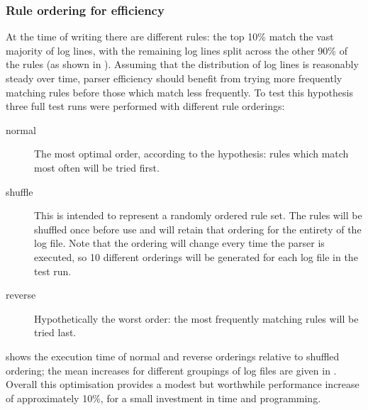 \subsubsection{Rule ordering for efficiency}

\label{rule ordering for efficiency}

At the time of writing there are \numberOFrules{} different rules: the top
10\% match the vast majority of log lines, with the remaining log lines
split across the other 90\% of the rules (as shown in ).  Assuming that the distribution of log lines is reasonably steady
over time, parser efficiency should benefit from trying more frequently
matching rules before those which match less frequently.  To test this
hypothesis three full test runs were performed with different rule
orderings:

\begin{description}

    \item [normal]  The most optimal order, according to the hypothesis:
        rules which match most often will be tried first.

    \item [shuffle] This is intended to represent a randomly ordered rule
        set.  The rules will be shuffled once before use and will retain
        that ordering for the entirety of the log file.  Note that the
        ordering will change every time the parser is executed, so 10
        different orderings will be generated for each log file in the test
        run.  

    \item [reverse] Hypothetically the worst order: the most frequently
        matching rules will be tried last.

\end{description}

 shows the execution time of normal and reverse orderings
relative to shuffled ordering; the mean increases for different groupings
of log files are given in .  Overall this optimisation provides a modest but worthwhile
performance increase of approximately 10\%, for a small investment in time
and programming.


